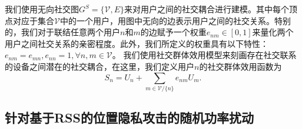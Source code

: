 我们使用无向社交图$G^S=\{\mathcal{V},E\}$来对用户之间的社交耦合进行建模。其中每个顶点对应于集合$\mathcal{V}$中的一个用户，用图中无向的边表示用户之间的社交关系。特别的，我们对于联结任意两个用户$n$和$m$的边赋予一个权重$e_{nm}\in [0,1]$来量化两个用户之间社交关系的亲密程度。此外，我们所定义的权重具有以下特性：$e_{nm}=e_{mn},e_{nn}=1, \forall n,m\in\mathcal{V}$。
我们使用社交群体效用模型来刻画存在社交联系的设备之间潜在的社交耦合，在这里，我们定义用户$n$的社交群体效用函数为
\vspace{-0.2cm}
\begin{equation}\label{sgu}
S_n=U_n+\sum_{m\in \mathcal{V}/\{n\}}e_{nm}U_m.
\end{equation}


\subsection{针对基于RSS的位置隐私攻击的随机功率扰动}\label{sec:privacy-model}

